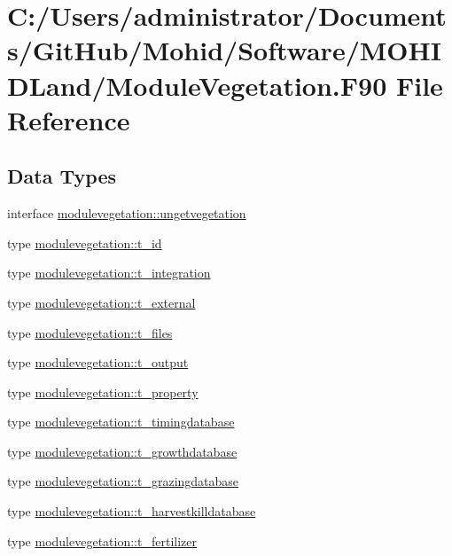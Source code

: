 \hypertarget{_module_vegetation_8_f90}{}\section{C\+:/\+Users/administrator/\+Documents/\+Git\+Hub/\+Mohid/\+Software/\+M\+O\+H\+I\+D\+Land/\+Module\+Vegetation.F90 File Reference}
\label{_module_vegetation_8_f90}
\subsection*{Data Types}
\begin{DoxyCompactItemize}
\item 
interface \mbox{\hyperlink{interfacemodulevegetation_1_1ungetvegetation}{modulevegetation\+::ungetvegetation}}
\item 
type \mbox{\hyperlink{structmodulevegetation_1_1t__id}{modulevegetation\+::t\+\_\+id}}
\item 
type \mbox{\hyperlink{structmodulevegetation_1_1t__integration}{modulevegetation\+::t\+\_\+integration}}
\item 
type \mbox{\hyperlink{structmodulevegetation_1_1t__external}{modulevegetation\+::t\+\_\+external}}
\item 
type \mbox{\hyperlink{structmodulevegetation_1_1t__files}{modulevegetation\+::t\+\_\+files}}
\item 
type \mbox{\hyperlink{structmodulevegetation_1_1t__output}{modulevegetation\+::t\+\_\+output}}
\item 
type \mbox{\hyperlink{structmodulevegetation_1_1t__property}{modulevegetation\+::t\+\_\+property}}
\item 
type \mbox{\hyperlink{structmodulevegetation_1_1t__timingdatabase}{modulevegetation\+::t\+\_\+timingdatabase}}
\item 
type \mbox{\hyperlink{structmodulevegetation_1_1t__growthdatabase}{modulevegetation\+::t\+\_\+growthdatabase}}
\item 
type \mbox{\hyperlink{structmodulevegetation_1_1t__grazingdatabase}{modulevegetation\+::t\+\_\+grazingdatabase}}
\item 
type \mbox{\hyperlink{structmodulevegetation_1_1t__harvestkilldatabase}{modulevegetation\+::t\+\_\+harvestkilldatabase}}
\item 
type \mbox{\hyperlink{structmodulevegetation_1_1t__fertilizer}{modulevegetation\+::t\+\_\+fertilizer}}

\end{DoxyCompactItemize}
